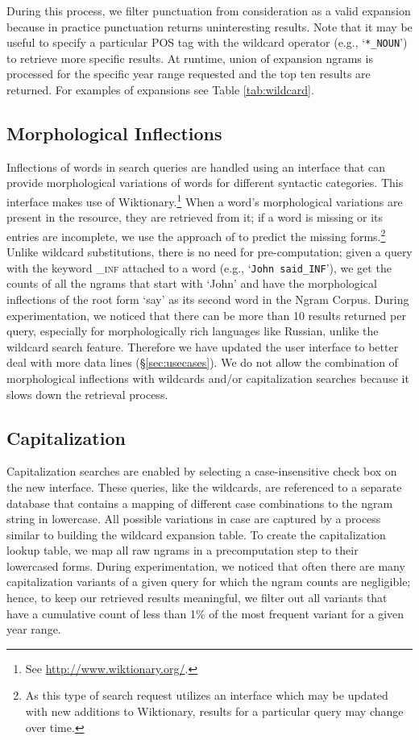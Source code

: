 \documentclass[11pt,a4paper]{article}
\newcommand{\query}[1]{\texttt{#1}}
\begin{document}
	During this process, we filter punctuation from consideration as a valid expansion because in practice punctuation returns uninteresting results. Note that it may be useful to specify a particular POS tag with the wildcard operator (e.g., `\query{*\_NOUN}') to retrieve more specific results. At runtime, union of expansion ngrams is processed for the specific year range requested and the top ten results are returned. For examples of expansions see Table \ref{tab:wildcard}. 


\subsection{Morphological Inflections}\label{sec:morph}
Inflections of words in search queries are handled using an interface that can provide morphological variations of words for different syntactic categories. This interface makes use of Wiktionary.\footnote{See \url{http://www.wiktionary.org/}.} When a word's
morphological variations are present in the resource, they are retrieved from it; if a word is missing or its entries are incomplete, we use the approach of  to predict the missing forms.\footnote{As this type of search request utilizes an interface which may be updated with new additions to Wiktionary, results for a particular query may change over time.} Unlike wildcard substitutions, there is no need for pre-computation; given a query with the keyword \textsf{\textsc{\_inf}} attached to a word (e.g., `\query{John said\_INF}'), we get the counts of all the ngrams that start with `John' and have the morphological inflections of the root form `say' as its second word in the Ngram Corpus. During experimentation, we noticed that there can be more than 10 results returned per query, especially for morphologically rich languages like Russian, unlike the wildcard search feature. Therefore we have updated the user interface to better deal with more data lines (\S\ref{sec:usecases}). We do not allow the combination of morphological inflections with wildcards and/or capitalization searches because it slows down the retrieval process.

\subsection{Capitalization}
Capitalization searches are enabled by selecting a case-insensitive check box on the new interface. These queries, like the wildcards, are referenced to a separate database that contains a mapping of different case combinations to the ngram string in lowercase. All possible variations in case are captured by a process similar to building the wildcard expansion table. To create the capitalization lookup table, we map all raw ngrams in a precomputation step to their lowercased forms. During experimentation, we noticed that often there are many capitalization variants of a given query for which the ngram counts are negligible; hence, to keep our retrieved results meaningful, we filter out all variants that have a cumulative count of less than 1\% of the most frequent variant for a given year range.
\end{document}
